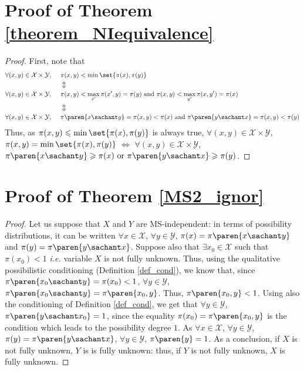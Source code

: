 \section{Proof of Theorem \ref{theorem_NIequivalence}}
\begin{proof}
First, note that
\begin{align*}
\forall (x,y) \in \mathcal{X} \times \mathcal{Y}, \hspace{0.5cm} & \pi(x,y) < \min \set{ \pi(x), \pi(y) } \\
 &\Updownarrow \\
\forall (x,y) \in \mathcal{X} \times \mathcal{Y}, \hspace{0.5cm} & \pi(x,y) < \max_{x'} \pi(x',y) = \pi(y) \mbox{ and } \pi(x,y) < \max_{y'} \pi(x,y') = \pi(x)\\
& \Updownarrow \\
\forall (x,y) \in \mathcal{X} \times \mathcal{Y}, \hspace{0.5cm} & \pi\paren{x \sachant y} = \pi(x,y) < \pi(x) \mbox{ and } \pi\paren{y \sachant x} = \pi(x,y) < \pi(y)
\end{align*}
Thus, as $\pi(x,y) \leqslant \min \set{ \pi(x), \pi(y) }$ is always true,
$\forall (x,y) \in \mathcal{X} \times \mathcal{Y}$, $\pi(x,y) = \min \set{ \pi(x), \pi(y) }$
$\Leftrightarrow$ $\forall (x,y) \in \mathcal{X} \times \mathcal{Y}$, $\pi\paren{x \sachant y} \geqslant \pi(x) \mbox{ or } \pi\paren{y \sachant x} \geqslant \pi(y)$.
\end{proof}







\section{Proof of Theorem \ref{MS2_ignor}}
\begin{proof}
Let us suppose that $X$ and $Y$ are MS-independent: in terms of possibility distributions,
it can be written $\forall x \in \mathcal{X}$, $\forall y \in \mathcal{Y}$, 
$\pi(x)=\pi \paren{ x \sachant y}$ and $\pi(y) = \pi \paren{ y \sachant x }$.
Suppose also that $\exists x_0 \in \mathcal{X}$ such that $\pi(x_0)<1$ 
\textit{i.e.} variable $X$ is not fully unknown.
Thus, using the qualitative possibilistic conditioning (Definition \ref{def_cond}),
we know that, since $\pi \paren{ x_0 \sachant y} = \pi(x_0) <1$, 
$\forall y \in \mathcal{Y}$, $\pi \paren{ x_0 \sachant y} = \pi \paren{x_0, y}$.
Thus, $\pi \paren{x_0, y} < 1$.
Using also the conditioning of Definition \ref{def_cond}, 
we get that $\forall y \in \mathcal{Y}$, $\pi \paren{ y \sachant x_0 }=1$,
since the equality $\pi(x_0) = \pi \paren{x_0, y}$ is the condition which leads to the possibility degree $1$.
As $\forall x \in \mathcal{X}$, $\forall y \in \mathcal{Y}$, $\pi(y) = \pi \paren{ y \sachant x }$,  $\forall y \in \mathcal{Y}$, $\pi \paren{ y  }=1$.
As a conclusion, if $X$ is not fully unknown, $Y$ is is fully unknown: 
thus, if $Y$ is not fully unknown, $X$ is fully unknown.
\end{proof}




